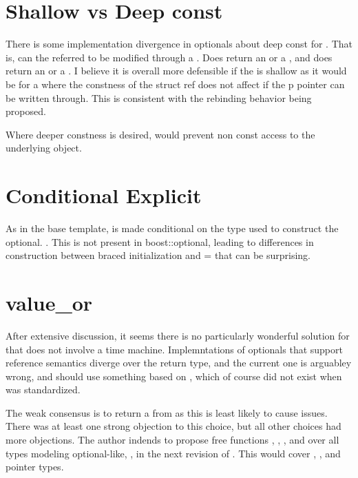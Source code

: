 \documentclass[a4paper,10pt,oneside,openany,final,article]{memoir}
\begin{document}
\section{Shallow vs Deep const}

There is some implementation divergence in optionals about deep const for . That is, can the referred to  be modified through a . Does  return an  or a , and does  return an  or a . I believe it is overall more defensible if the  is shallow as it would be for a  where the constness of the struct ref does not affect if the p pointer can be written through. This is consistent with the rebinding behavior being proposed.

Where deeper constness is desired,  would prevent non const access to the underlying object.

\section{Conditional Explicit}
As in the base template,  is made conditional on the type used to construct the optional. . This is not present in boost::optional, leading to differences in construction between braced initialization and = that can be surprising.

\section{value_or}

After extensive discussion, it seems there is no particularly wonderful solution for  that does not involve a time machine. Implemntations of optionals that support reference semantics diverge over the return type, and the current one is arguabley wrong, and should use something based on , which of course did not exist when  was standardized.

The weak consensus is to return a  from  as this is least likely to cause issues. There was at least one strong objection to this choice, but all other choices had more objections. The author indends to propose free functions , , , and  over all types modeling optional-like, , in the next revision of \cite{P1255R12}. This would cover , , and pointer types.
\end{document}
